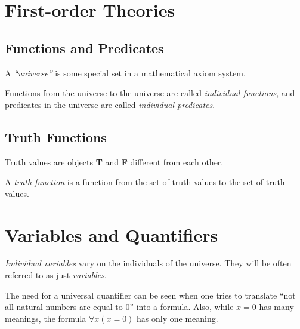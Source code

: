 \section{First-order Theories}

\subsection{Functions and Predicates}

\begin{definition}[``Universe'']
	A \emph{``universe''} is some special set in a mathematical axiom system.
\end{definition}

\begin{definition}
	Functions from the universe to the universe are called \emph{individual functions}, and predicates
	in the universe are called \emph{individual predicates}.
\end{definition}

\subsection{Truth Functions}

\begin{definition}
	Truth values are objects \textbf{T} and \textbf{F} different from each other.
\end{definition}

\begin{definition}
	A \emph{truth function} is a function from the set of truth values to the set of truth values.
\end{definition}

\section{Variables and Quantifiers}

\begin{definition}
	\emph{Individual variables} vary on the individuals of the universe. They will be often
	referred to as just \emph{variables}.
\end{definition}

\begin{remark}
	The need for a universal quantifier can be seen when one tries to translate 
	``not all natural numbers are equal to 0'' into a formula. Also, while $x=0$ has many
	meanings, the formula $\forall x (x=0)$ has only one meaning.
\end{remark}


